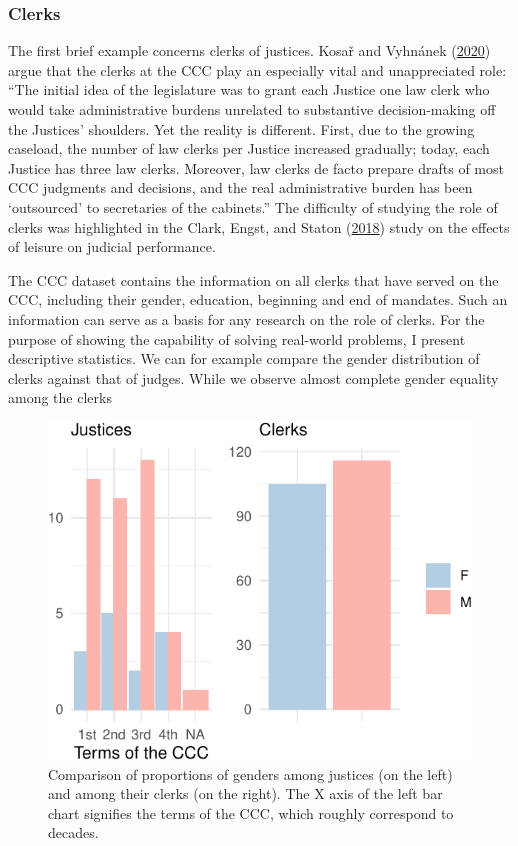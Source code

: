 \documentclass[
  11pt,
]{article}
\begin{document}
\hypertarget{clerks}{%
\subsubsection{Clerks}\label{clerks}}

The first brief example concerns clerks of justices. Kosař and Vyhnánek
(\protect\hyperlink{ref-kosarConstitutionalCourtCzechia2020}{2020})
argue that the clerks at the CCC play an especially vital and
unappreciated role: ``The initial idea of the legislature was to grant
each Justice one law clerk who would take administrative burdens
unrelated to substantive decision-making off the Justices' shoulders.
Yet the reality is different. First, due to the growing caseload, the
number of law clerks per Justice increased gradually; today, each
Justice has three law clerks. Moreover, law clerks de facto prepare
drafts of most CCC judgments and decisions, and the real administrative
burden has been `outsourced' to secretaries of the cabinets.'' The
difficulty of studying the role of clerks was highlighted in the Clark,
Engst, and Staton
(\protect\hyperlink{ref-clarkEstimatingEffectLeisure2018}{2018}) study
on the effects of leisure on judicial performance.

The CCC dataset contains the information on all clerks that have served
on the CCC, including their gender, education, beginning and end of
mandates. Such an information can serve as a basis for any research on
the role of clerks. For the purpose of showing the capability of solving
real-world problems, I present descriptive statistics. We can for
example compare the gender distribution of clerks against that of
judges. While we observe almost complete gender equality among the
clerks

\begin{figure}
\centering
\includegraphics{ANONYMIZED_The_Czech_Constitutional_Court_Dataset_files/figure-latex/gender1-1.pdf}
\caption{Comparison of proportions of genders among justices (on the
left) and among their clerks (on the right). The X axis of the left bar
chart signifies the terms of the CCC, which roughly correspond to
decades.}
\end{figure}
\end{document}
